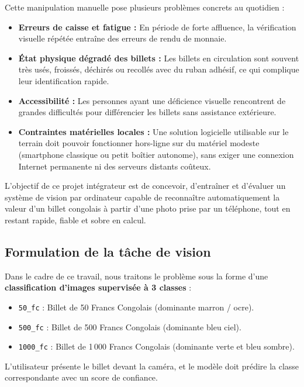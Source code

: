 \documentclass[11pt,a4paper]{article}
\begin{document}
Cette manipulation manuelle pose plusieurs problèmes concrets au quotidien :
\begin{itemize}
    \item \textbf{Erreurs de caisse et fatigue :} En période de forte affluence, la vérification visuelle répétée entraîne des erreurs de rendu de monnaie.
    \item \textbf{État physique dégradé des billets :} Les billets en circulation sont souvent très usés, froissés, déchirés ou recollés avec du ruban adhésif, ce qui complique leur identification rapide.
    \item \textbf{Accessibilité :} Les personnes ayant une déficience visuelle rencontrent de grandes difficultés pour différencier les billets sans assistance extérieure.
    \item \textbf{Contraintes matérielles locales :} Une solution logicielle utilisable sur le terrain doit pouvoir fonctionner hors-ligne sur du matériel modeste (smartphone classique ou petit boîtier autonome), sans exiger une connexion Internet permanente ni des serveurs distants coûteux.
\end{itemize}

L'objectif de ce projet intégrateur est de concevoir, d'entraîner et d'évaluer un système de vision par ordinateur capable de reconnaître automatiquement la valeur d'un billet congolais à partir d'une photo prise par un téléphone, tout en restant rapide, fiable et sobre en calcul.

\subsection{Formulation de la tâche de vision}
Dans le cadre de ce travail, nous traitons le problème sous la forme d'une \textbf{classification d'images supervisée à 3 classes} :
\begin{itemize}
    \item \texttt{50\_fc} : Billet de 50 Francs Congolais (dominante marron / ocre).
    \item \texttt{500\_fc} : Billet de 500 Francs Congolais (dominante bleu ciel).
    \item \texttt{1000\_fc} : Billet de 1\,000 Francs Congolais (dominante verte et bleu sombre).
\end{itemize}

L'utilisateur présente le billet devant la caméra, et le modèle doit prédire la classe correspondante avec un score de confiance.
\end{document}
